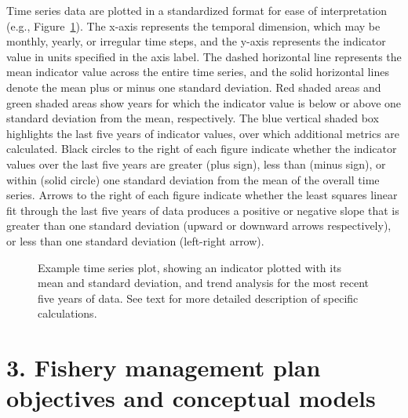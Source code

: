 \documentclass[
  letterpaper,
  oneside,
  open=any]{scrbook}
\begin{document}
Time series data are plotted in a standardized format for ease of
interpretation (e.g., Figure~\ref{fig-2}). The x-axis represents the
temporal dimension, which may be monthly, yearly, or irregular time
steps, and the y-axis represents the indicator value in units specified
in the axis label. The dashed horizontal line represents the mean
indicator value across the entire time series, and the solid horizontal
lines denote the mean plus or minus one standard deviation. Red shaded
areas and green shaded areas show years for which the indicator value is
below or above one standard deviation from the mean, respectively. The
blue vertical shaded box highlights the last five years of indicator
values, over which additional metrics are calculated. Black circles to
the right of each figure indicate whether the indicator values over the
last five years are greater (plus sign), less than (minus sign), or
within (solid circle) one standard deviation from the mean of the
overall time series. Arrows to the right of each figure indicate whether
the least squares linear fit through the last five years of data
produces a positive or negative slope that is greater than one standard
deviation (upward or downward arrows respectively), or less than one
standard deviation (left-right arrow).

\begin{figure}


\caption{\label{fig-2}Example time series plot, showing an indicator
plotted with its mean and standard deviation, and trend analysis for the
most recent five years of data. See text for more detailed description
of specific calculations.}

\end{figure}%


\chapter{3. Fishery management plan objectives and conceptual
models}\label{fishery-management-plan-objectives-and-conceptual-models}
\end{document}
